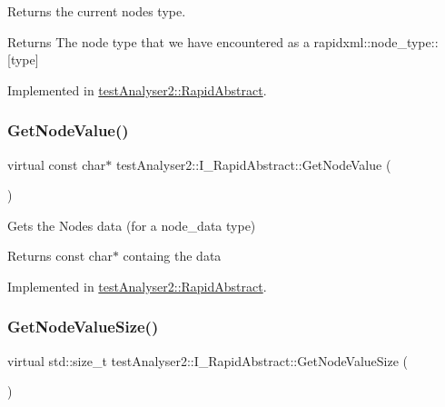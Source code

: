 Returns the current node\textquotesingle{}s type. 

\begin{DoxyReturn}{Returns}
The node type that we have encountered as a rapidxml\+::node\+\_\+type\+:\+:\mbox{[}type\mbox{]} 
\end{DoxyReturn}


Implemented in \mbox{\hyperlink{classtestAnalyser2_1_1RapidAbstract_a9897ce59179b6bf0a0e76845931f39fb}{test\+Analyser2\+::\+Rapid\+Abstract}}.

\mbox{\label{classtestAnalyser2_1_1I__RapidAbstract_a0d4dd17120e75549ee68181cc4a4e503}} 
\subsubsection{\texorpdfstring{GetNodeValue()}{GetNodeValue()}}
{\footnotesize\ttfamily virtual const char$\ast$ test\+Analyser2\+::\+I\+\_\+\+Rapid\+Abstract\+::\+Get\+Node\+Value (\begin{DoxyParamCaption}{ }\end{DoxyParamCaption})\hspace{0.3cm}{\ttfamily [pure virtual]}}



Gets the Node\textquotesingle{}s data (for a node\+\_\+data type) 

\begin{DoxyReturn}{Returns}
const char$\ast$ containg the data 
\end{DoxyReturn}


Implemented in \mbox{\hyperlink{classtestAnalyser2_1_1RapidAbstract_a80bd2529fc3b0d6678a166d3192d4a60}{test\+Analyser2\+::\+Rapid\+Abstract}}.

\mbox{\label{classtestAnalyser2_1_1I__RapidAbstract_ad30a0a18d8a387ab48c95270b70042b4}} 
\subsubsection{\texorpdfstring{GetNodeValueSize()}{GetNodeValueSize()}}
{\footnotesize\ttfamily virtual std\+::size\+\_\+t test\+Analyser2\+::\+I\+\_\+\+Rapid\+Abstract\+::\+Get\+Node\+Value\+Size (\begin{DoxyParamCaption}{ }\end{DoxyParamCaption})\hspace{0.3cm}{\ttfamily [pure virtual]}}




